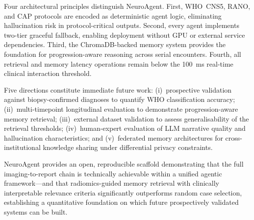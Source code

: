 \documentclass[journal]{IEEEtran}
\begin{document}
Four architectural principles distinguish NeuroAgent. First, WHO~CNS5,
RANO, and CAP protocols are encoded as deterministic agent logic, eliminating
hallucination risk in protocol-critical outputs. Second, every agent
implements two-tier graceful fallback, enabling deployment without GPU
or external service dependencies. Third, the ChromaDB-backed memory
system provides the foundation for progression-aware reasoning across
serial encounters. Fourth, all retrieval and memory latency operations
remain below the 100~ms real-time clinical interaction threshold.

Five directions constitute immediate future work: (i)~prospective
validation against biopsy-confirmed diagnoses to quantify WHO classification
accuracy; (ii)~multi-timepoint longitudinal evaluation to demonstrate
progression-aware memory retrieval; (iii)~external dataset validation
to assess generalisability of the retrieval thresholds; (iv)~human-expert
evaluation of LLM narrative quality and hallucination characteristics;
and (v)~federated memory architectures for cross-institutional knowledge
sharing under differential privacy constraints.

NeuroAgent provides an open, reproducible scaffold demonstrating that the
full imaging-to-report chain is technically achievable within a unified
agentic framework---and that radiomics-guided memory retrieval with
clinically interpretable relevance criteria significantly outperforms
random case selection, establishing a quantitative foundation on which
future prospectively validated systems can be built.
\end{document}
